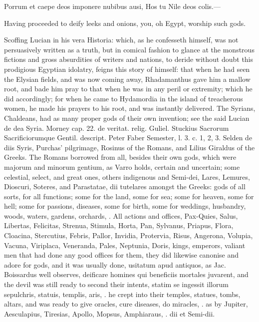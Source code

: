 {\begin{latin}%
\begin{displayquote}%
Porrum et caepe deos imponere nubibus ausi,
Hos tu Nile deos colis.---
\end{displayquote}%
\end{latin}%
\translationrule%
\begin{displayquote}%
Having proceeded to deify leeks and onions, you, oh Egypt, worship such gods.
\end{displayquote}%

Scoffing Lucian in his vera Historia: which, as he confesseth
himself, was not persuasively written as a truth, but in comical
fashion to glance at the monstrous fictions and gross absurdities of
writers and nations, to deride without doubt this prodigious Egyptian
idolatry, feigns this story of himself: that when he had seen the
Elysian fields, and was now coming away, Rhadamanthus gave him a mallow
root, and bade him pray to that when he was in any peril or extremity;
which he did accordingly; for when he came to Hydamordia in the island
of treacherous women, he made his prayers to his root, and was
instantly delivered. The Syrians, Chaldeans, had as many proper gods of
their own invention; see the said Lucian de dea Syria. Morney cap. 22.
de veritat. relig. Guliel. Stuckius Sacrorum Sacrificiorumque
Gentil. descript. Peter Faber Semester, l. 3. c. 1, 2, 3. Selden de
diis Syris, Purchas' pilgrimage,  Rosinus of the Romans, and
Lilius Giraldus of the Greeks. The Romans borrowed from all, besides
their own gods, which were majorum and minorum gentium, as Varro holds,
certain and uncertain; some celestial, select, and great ones, others
indigenous and Semi-dei, Lares, Lemures, Dioscuri, Soteres, and
Parastatae, dii tutelares amongst the Greeks: gods of all sorts, for
all functions; some for the land, some for sea; some for heaven, some
for hell; some for passions, diseases, some for birth, some for
weddings, husbandry, woods, waters, gardens, orchards, \etc{}. All actions
and offices, Pax-Quies, Salus, Libertas, Felicitas, Strenua, Stimula,
Horta, Pan, Sylvanus, Priapus, Flora, Cloacina, Stercutius, Febris,
Pallor, Invidia, Protervia, Risus, Angerona, Volupia, Vacuna,
Viriplaca, Veneranda, Pales, Neptunia, Doris, kings, emperors, valiant
men that had done any good offices for them, they did likewise canonise
and adore for gods, and it was usually done, usitatum apud antiquos, as
Jac. Boissardus well observes, deificare homines qui beneficiis
mortales juvarent, and the devil was still ready to second their
intents, statim se ingessit illorum sepulchris, statuis, templis, aris,
\etc{}. he crept into their temples, statues, tombs, altars, and was ready
to give oracles, cure diseases, do miracles, \etc{}. as by Jupiter,
Aesculapius, Tiresias, Apollo, Mopsus, Amphiaraus, \etc{}. dii et Semi-dii.

}
